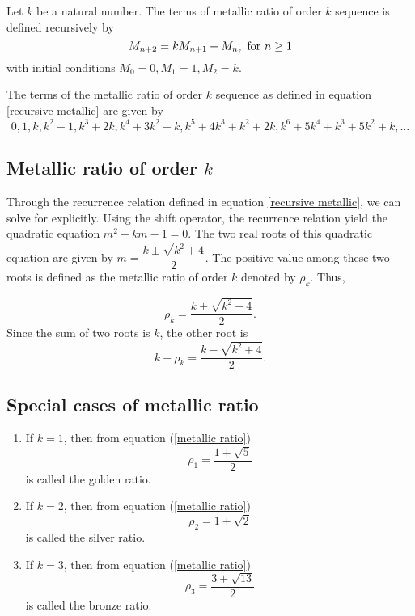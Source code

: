 \documentclass{rmutt-seminar}
\begin{document}
\begin{definition}
Let $ k $ be a natural number. The terms of metallic ratio of order $k$ sequence is defined recursively by 
\begin{equation}\label{recursive metallic}
	M_{n+2} =kM_{n+1}+M_n,\textnormal{ for } n \geq 1 
\end{equation}
with initial conditions $M_0 = 0, M_1 = 1, M_2 = k$. 
\newline 

The terms of the metallic ratio of order $k$ sequence as defined in equation \eqref{recursive metallic} are given by 
\begin{equation}\label{metallic ratio order k sequence}
	 0,1, k, k^2 + 1, k^3 + 2k, k^4 + 3k^2 + k, k^5 +4k^3 +k^2 + 2k, k^6 + 5k^4 + k^3 + 5k^2 + k, \ldots
\end{equation}

\subsection{Metallic ratio of order $ k $}
Through the recurrence relation defined in equation \eqref{recursive metallic}, we can solve for explicitly. Using the shift operator, the 
recurrence relation yield the quadratic equation $ m^2 - km - 1 = 0 $. The two real roots of this quadratic equation are 
given by $ m = \dfrac{k \pm \sqrt{k^2 + 4} }{2}$. The positive value among these two roots is defined as the metallic ratio of order 
$ k $ denoted by $ \rho_{k} $. Thus,

 \begin{equation}\label{metallic ratio}
	\rho_{k} = \frac{k+\sqrt{k^2 + 4}}{2}.
\end{equation}
Since the sum of two roots is $ k $, the other root is
 \begin{equation}\label{other root metallic ratio}
 	  k - \rho_k = \frac{k - \sqrt{k^2 + 4}}{2}.
 \end{equation}

\subsection{Special cases of metallic ratio}
\begin{enumerate}[label=(\roman*)]

\item If $ k = 1$, then from equation (\ref{metallic ratio})
\begin{equation}\label{golden ratio}
	\rho_{1}=\frac{1+\sqrt{5}}{2}
\end{equation} 
is called the golden ratio.
\item If $ k = 2$, then from equation  (\ref{metallic ratio})
\begin{equation}\label{silver ratio}
	\rho_{2}=1+\sqrt{2}
\end{equation} 
is called the silver ratio.
\item If $ k = 3$, then from equation (\ref{metallic ratio})
\begin{equation}\label{bronze ratio}
	\rho_{3}=\frac{3+\sqrt{13}}{2}
\end{equation}
 is called the bronze ratio.
\end{enumerate}


\end{definition}
\end{document}
